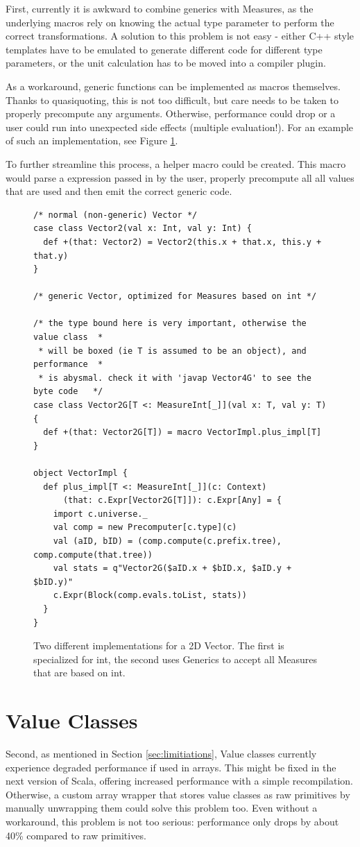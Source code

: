 \documentclass[12pt,oneside,a4paper]{scrbook}
\begin{document}
First, currently it is awkward to combine generics with Measures, as the underlying macros rely on knowing the actual type parameter to perform the correct transformations. A solution to this problem is not easy - either C++ style templates have to be emulated to generate different code for different type parameters, or the unit calculation has to be moved into a compiler plugin.

As a workaround, generic functions can be implemented as macros themselves. Thanks to quasiquoting, this is not too difficult, but care needs to be taken to properly precompute any arguments. Otherwise, performance could drop or a user could run into unexpected side effects (multiple evaluation!). For an example of such an implementation, see Figure \ref{code:scala_generic}.

To further streamline this process, a helper macro could be created. This macro would parse a expression passed in by the user, properly precompute all all values that are used and then emit the correct generic code.

\begin{figure}
\begin{verbatim}
/* normal (non-generic) Vector */
case class Vector2(val x: Int, val y: Int) {
  def +(that: Vector2) = Vector2(this.x + that.x, this.y + that.y)
}

/* generic Vector, optimized for Measures based on int */

/* the type bound here is very important, otherwise the value class  *
 * will be boxed (ie T is assumed to be an object), and performance  *
 * is abysmal. check it with 'javap Vector4G' to see the byte code   */
case class Vector2G[T <: MeasureInt[_]](val x: T, val y: T) {
  def +(that: Vector2G[T]) = macro VectorImpl.plus_impl[T]
}

object VectorImpl {
  def plus_impl[T <: MeasureInt[_]](c: Context)
      (that: c.Expr[Vector2G[T]]): c.Expr[Any] = {
    import c.universe._
    val comp = new Precomputer[c.type](c)
    val (aID, bID) = (comp.compute(c.prefix.tree), comp.compute(that.tree))
    val stats = q"Vector2G($aID.x + $bID.x, $aID.y + $bID.y)"
    c.Expr(Block(comp.evals.toList, stats))
  }
}
\end{verbatim}
\caption{Two different implementations for a 2D Vector. The first is specialized for int, the second uses Generics to accept all Measures that are based on int.}
\label{code:scala_generic}
\end{figure}

\section{Value Classes}
Second, as mentioned in Section \ref{sec:limitiations}, Value classes currently experience degraded performance if used in arrays. This might be fixed in the next version of Scala, offering increased performance with a simple recompilation. Otherwise, a custom array wrapper that stores value classes as raw primitives by manually unwrapping them could solve this problem too. Even without a workaround, this problem is not too serious: performance only drops by about 40\% compared to raw primitives.


\singlespacing

{}
\end{document}

